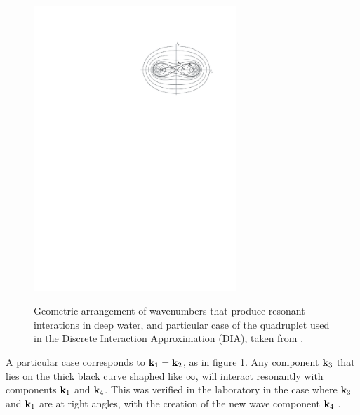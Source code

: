 \begin{figure}[H]
\centerline{\includegraphics[width=0.68\textwidth]{FIGS_CH_SOURCETERMS/DIA_diagram.pdf}}
\caption{Geometric arrangement of wavenumbers that produce resonant interations in deep water, and particular 
case of the quadruplet used in the Discrete Interaction Approximation (DIA), taken from \cite{vanVledder2006}.}{
} \label{fig_DIA}
\end{figure}
A particular case corresponds to $\mathbf{k}_1=\mathbf{k}_2$, as in figure \ref{fig_DIA}. Any component $\mathbf{k}_3$ that lies on the thick black curve shaphed like $\infty$, will interact resonantly 
with components $\mathbf{k}_1$ and $\mathbf{k}_4$. This was verified in the laboratory in the case where $\mathbf{k}_3$ and $\mathbf{k}_1$ are at right angles, 
with the creation of the new wave component $\mathbf{k}_4$ \citep{McGoldrick&al.1966}. 


